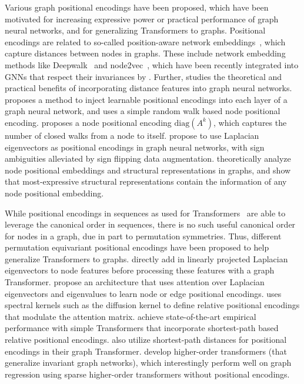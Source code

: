 \documentclass{article} \usepackage{iclr2023_conference,times}
\newcommand{\mrm}[1]{\mathrm{#1}}
\begin{document}
Various graph positional encodings have been proposed, which have been motivated for increasing expressive power or practical performance of graph neural networks, and for  generalizing Transformers to graphs. Positional encodings are related to so-called position-aware network embeddings~\citep{chami2020machine}, which capture distances between nodes in graphs. These include network embedding methods like Deepwalk~\citep{perozzi2014deepwalk} and node2vec~\citep{grover2016node2vec}, which have been recently integrated into GNNs that respect their invariances by \cite{wang2022equivariant}. Further, \cite{li2020distance} studies the theoretical and practical benefits of incorporating distance features into graph neural networks. \cite{dwivedi2022graph} proposes a method to inject learnable positional encodings into each layer of a graph neural network, and uses a simple random walk based node positional encoding. \cite{you2021identity} proposes a node positional encoding $\mrm{diag}(A^k)$, which captures the number of closed walks from a node to itself. \cite{dwivedi2020benchmarking} propose to use Laplacian eigenvectors as positional encodings in graph neural networks, with sign ambiguities alleviated by sign flipping data augmentation. \cite{srinivasan2019equivalence} theoretically analyze node positional embeddings and structural representations in graphs, and show that most-expressive structural representations contain the information of any node positional embedding.

While positional encodings in sequences as used for Transformers~\citep{vaswani2017attention} are able to leverage the canonical order in sequences, there is no such useful canonical order for nodes in a graph, due in part to permutation symmetries. Thus, different permutation equivariant positional encodings have been proposed to help generalize Transformers to graphs. \cite{dwivedi2020generalization} directly add in linearly projected Laplacian eigenvectors to node features before processing these features with a graph Transformer. \cite{kreuzer2021rethinking} propose an architecture that uses attention over Laplacian eigenvectors and eigenvalues to learn node or edge positional encodings. \cite{mialon2021graphit} uses spectral kernels such as the diffusion kernel to define relative positional encodings that modulate the attention matrix. \cite{ying2021transformers} achieve state-of-the-art empirical performance with simple Transformers that incorporate shortest-path based relative positional encodings. \cite{zhang2020graph} also utilize shortest-path distances for positional encodings in their graph Transformer. \cite{kim2021transformers} develop higher-order transformers (that generalize invariant graph networks), which interestingly perform well on graph regression using sparse higher-order transformers without positional encodings.
\end{document}
